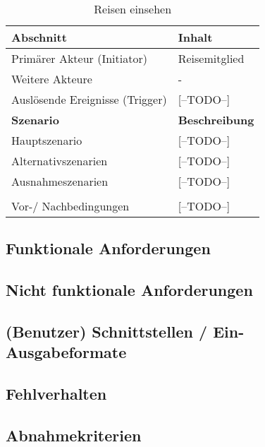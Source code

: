 \begin{table}[H]
	\caption{Reisen einsehen}
	\begin{tabularx}{0.95\textwidth}{ |X|X| }
		\hline
		\rowcolor{gray} \textbf{Abschnitt}     & \textbf{Inhalt}       \\
		\hline
		Primärer Akteur (Initiator)            & Reisemitglied         \\
		\hline
		Weitere Akteure                        & -                     \\
		\hline
		Auslösende Ereignisse (Trigger)        & [--TODO--]            \\

		\hline
		\rowcolor{lightgray} \textbf{Szenario} & \textbf{Beschreibung} \\
		\hline
		Hauptszenario                          & [--TODO--]            \\
		\hline
		Alternativszenarien                    & [--TODO--]            \\
		\hline
		Ausnahmeszenarien                      & [--TODO--]            \\
		\hline
		\rowcolor{lightgray}                   &                       \\
		\hline
		Vor-/ Nachbedingungen                  & [--TODO--]            \\
		\hline
	\end{tabularx}
\end{table}


\subsection{Funktionale Anforderungen}

\subsection{ Nicht funktionale Anforderungen}

\subsection{(Benutzer) Schnittstellen / Ein-Ausgabeformate}

\subsection{Fehlverhalten}

\subsection{Abnahmekriterien}